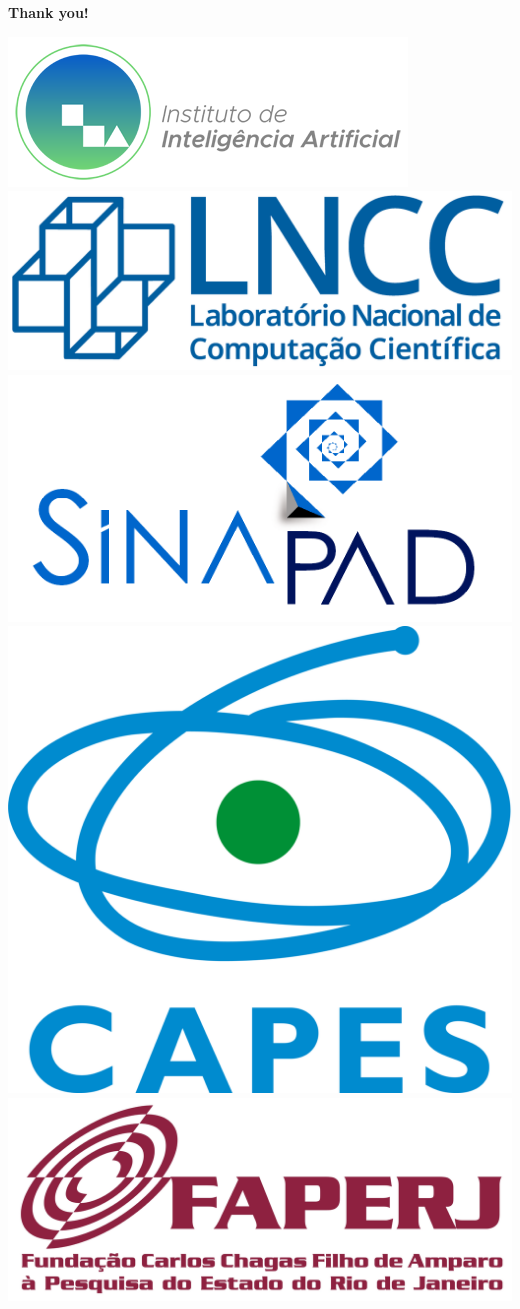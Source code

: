 \documentclass[aspectratio=169,xcolor=dvipsnames]{beamer}
\begin{document}

%     
%     




\begin{frame}
    \Huge{\centerline{\textbf{Thank you!}}}
    \vspace{1em}
    \begin{center}
        \includegraphics[height=1.cm]{imgs/logos/logo-instituto-ia.png}%
        \hspace{0.5cm}%
        \includegraphics[height=1.cm]{imgs/logos/lncc-logo.png}%
        \hspace{0.5cm}%
        \includegraphics[height=1.cm]{imgs/logos/logo-sinapad.png}
        \hspace{0.5cm}%
        \includegraphics[height=1.cm]{imgs/logos/logo-capes.png}%
        \hspace{0.5cm}%
        \includegraphics[height=1.cm]{imgs/logos/logo-faperj.jpg}%

    \end{center}
\end{frame}
\end{document}
